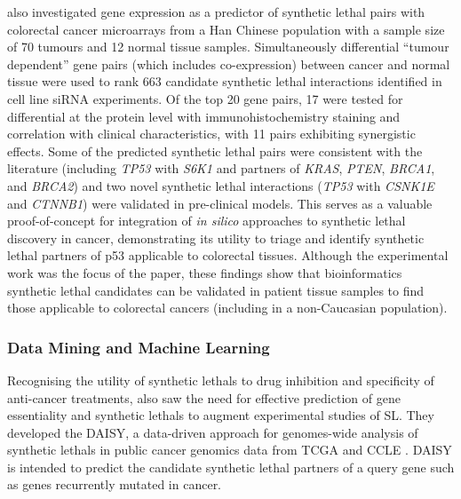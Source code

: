 \citet{Tiong2014} also investigated \gls{gene expression} as a predictor of \gls{synthetic lethal} pairs with colorectal cancer \glspl{microarray} from a Han Chinese population with a sample size of 70 tumours and 12 normal tissue samples. Simultaneously differential  ``tumour dependent'' gene pairs (which includes co-expression) between cancer and normal tissue were used to rank 663 candidate \gls{synthetic lethal} interactions identified in cell line \gls{siRNA} experiments. Of the top 20 gene pairs, 17 were tested for differential  at the protein level with immunohistochemistry staining and correlation with clinical characteristics, with 11 pairs exhibiting synergistic effects. Some of the predicted \gls{synthetic lethal} pairs were consistent with the literature (including \textit{TP53} with \textit{S6K1} and partners of \textit{KRAS},  \textit{PTEN}, \textit{BRCA1}, and \textit{BRCA2}) and two novel \gls{synthetic lethal} interactions (\textit{TP53} with \textit{CSNK1E} and \textit{CTNNB1}) were validated in pre-clinical models. This serves as a valuable proof-of-concept for integration of \textit{in silico} approaches to \gls{synthetic lethal} discovery in cancer, demonstrating its utility to triage and identify \gls{synthetic lethal} partners of p53 applicable to colorectal tissues. Although the experimental work was the focus of the paper, these findings show that \gls{bioinformatics} \gls{synthetic lethal} candidates can be validated in patient tissue samples to find those applicable to colorectal cancers (including in a non-Caucasian population).

\subsubsection{Data Mining and Machine Learning}


Recognising the utility of \glspl{synthetic lethal} to drug inhibition and specificity of anti-cancer \glspl{treatment}, \citet{Jerby2014} also saw the need for effective prediction of gene essentiality and \glspl{synthetic lethal} to augment experimental studies of SL. They developed the \gls{DAISY}, a data-driven approach for \glspl{genome}-wide analysis of \glspl{synthetic lethal} in public cancer \glspl{genomic} data from \gls{TCGA} and \gls{CCLE}  \citep{Barretina2012}. \gls{DAISY} is intended to predict the candidate \gls{synthetic lethal} partners of a query gene such as genes recurrently mutated in cancer.  

